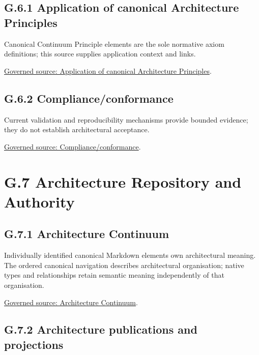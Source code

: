 \subsection*{G.6.1 Application of canonical Architecture Principles}
\label{navigation:G.6.1}

Canonical Continuum Principle elements are the sole normative axiom definitions; this source supplies application context and links.\par
\href{../../../../governance/architectural-axioms.md}{Governed source: Application of canonical Architecture Principles}.\par
\subsection*{G.6.2 Compliance/conformance}
\label{navigation:G.6.2}

Current validation and reproducibility mechanisms provide bounded evidence; they do not establish architectural acceptance.\par
\href{../../../../tooling/README.md}{Governed source: Compliance/conformance}.\par
\section*{G.7 Architecture Repository and Authority}
\label{navigation:G.7}

\subsection*{G.7.1 Architecture Continuum}
\label{navigation:G.7.1}

Individually identified canonical Markdown elements own architectural meaning. The ordered canonical navigation describes architectural organisation; native types and relationships retain semantic meaning independently of that organisation.\par
\href{../../../../governance/continuum-representation.md}{Governed source: Architecture Continuum}.\par
\subsection*{G.7.2 Architecture publications and projections}
\label{navigation:G.7.2}

